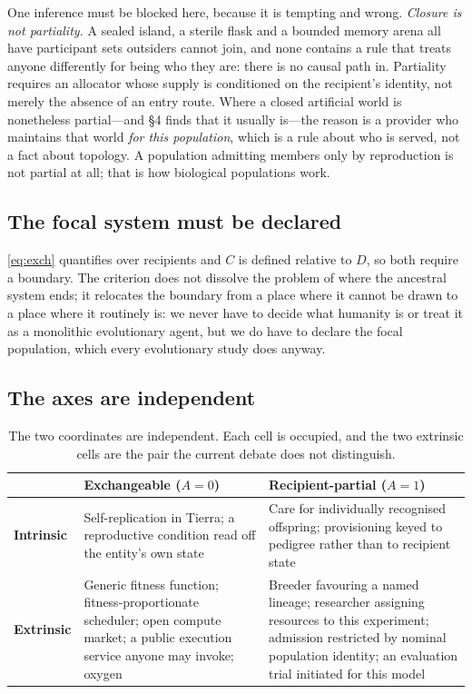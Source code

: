 \documentclass[review,3p,times]{elsarticle}
\begin{document}
One inference must be blocked here, because it is tempting and wrong.
\emph{Closure is not partiality.} A sealed island, a sterile flask and a
bounded memory arena all have participant sets outsiders cannot join, and none
contains a rule that treats anyone differently for being who they are: there is
no causal path in. Partiality requires an allocator whose supply is conditioned
on the recipient's identity, not merely the absence of an entry route. Where a
closed artificial world is nonetheless partial---and \S4 finds that it usually
is---the reason is a provider who maintains that world \emph{for this
population}, which is a rule about who is served, not a fact about topology. A
population admitting members only by reproduction is not partial at all; that
is how biological populations work.

\subsection{The focal system must be declared}

\eqref{eq:exch} quantifies over recipients and $C$ is defined relative to
$D$, so both require a boundary. The criterion does not dissolve the problem
of where the ancestral system ends; it relocates the boundary from a place
where it cannot
be drawn to a place where it routinely is: we never have to decide what
humanity is or treat it as a monolithic evolutionary agent, but we do have
to declare the focal population, which every evolutionary study does
anyway.

\subsection{The axes are independent}

\begin{table}[ht]
\centering
\small
\caption{The two coordinates are independent. Each cell is occupied, and
the two extrinsic cells are the pair the current debate does not
distinguish.}
\label{tab:2x2}
\begin{tabular}{p{2.4cm}p{5.5cm}p{5.5cm}}
\toprule
 & \textbf{Exchangeable} ($A=0$) & \textbf{Recipient-partial} ($A=1$)\\
\midrule
\textbf{Intrinsic}
& Self-replication in Tierra; a reproductive condition read off the
entity's own state
& Care for individually recognised offspring; provisioning keyed to pedigree
rather than to recipient state\\
\addlinespace
\textbf{Extrinsic}
& Generic fitness function; fitness-proportionate scheduler; open compute
market; a public execution service anyone may invoke; oxygen
& Breeder favouring a named lineage; researcher assigning resources to this
experiment; admission restricted by nominal population identity; an evaluation
trial initiated for this model\\
\bottomrule
\end{tabular}
\end{table}
\end{document}
